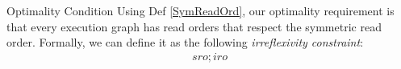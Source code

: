         \begin{definition}{Optimality Condition}
            \label{opt_cond}
            Using Def \ref{SymReadOrd}, our optimality requirement is that every execution graph has read orders that respect the symmetric read order.
            Formally, we can define it as the following \textit{irreflexivity constraint}:
            \begin{align*}
                sro;iro
            \end{align*}

        \end{definition}

%
%
%
%
%
%
